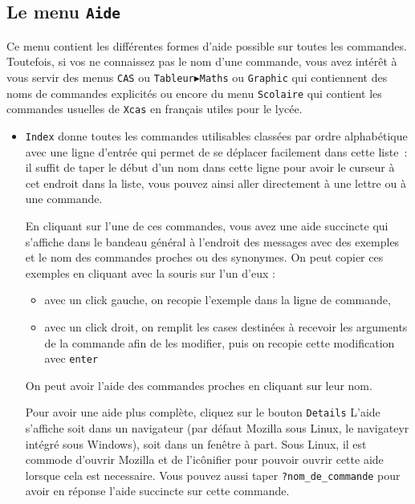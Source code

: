 \documentclass[a4paper,11pt]{article}
\begin{document}
\subsection{Le menu {\tt Aide}}\label{sec:aide}
Ce menu contient les diff\'erentes formes d'aide possible sur toutes les 
commandes.\\
Toutefois, si vos ne connaissez pas le nom d'une commande, vous avez 
int\'er\^et \`a vous servir des menus {\tt CAS} ou 
{\tt Tableur$\blacktriangleright$Maths} ou {\tt Graphic} qui contiennent
des noms de commandes explicit\'es ou encore du menu {\tt Scolaire} qui 
contient les commandes usuelles de {\tt Xcas} en fran\c{c}ais utiles pour
le lyc\'ee.
\begin{itemize}
\item
{\tt Index}
donne toutes les commandes utilisables class\'ees par ordre alphab\'etique
avec  une ligne d'entr\'ee qui permet de se d\'eplacer facilement dans 
cette liste~: il suffit de taper le d\'ebut d'un nom dans cette ligne pour 
avoir le curseur \`a cet endroit dans la liste, vous pouvez ainsi aller 
directement \`a une lettre ou \`a une commande.

En cliquant sur l'une de ces commandes, vous avez une aide succincte qui 
s'affiche dans le bandeau g\'en\'eral \`a l'endroit des messages avec des 
exemples et le nom des commandes proches ou des synonymes.
On peut copier ces exemples  en cliquant avec la souris sur l'un d'eux :
\begin{itemize}
\item  avec un click gauche, on recopie l'exemple dans la ligne de commande,
\item  avec un click droit, on  remplit les cases destin\'ees \`a recevoir 
les arguments de la commande  afin de les modifier, puis on 
recopie cette modification avec {\tt enter}  
\end{itemize}
On peut avoir l'aide des commandes proches en cliquant sur leur nom.

Pour avoir une aide plus compl\`ete, cliquez sur le bouton {\tt Details}
L'aide s'affiche soit dans un navigateur
(par d\'efaut Mozilla sous Linux, le navigateyr int\'egr\'e sous Windows), 
soit dans un fen\^etre \`a part. 
Sous Linux, il est commode d'ouvrir Mozilla et de 
l'ic\^onifier pour pouvoir ouvrir cette aide lorsque cela est necessaire. Vous 
pouvez aussi taper {\tt ?nom\_de\_commande} pour avoir en r\'eponse l'aide 
succincte sur cette commande.


\end{itemize}
\end{document}
